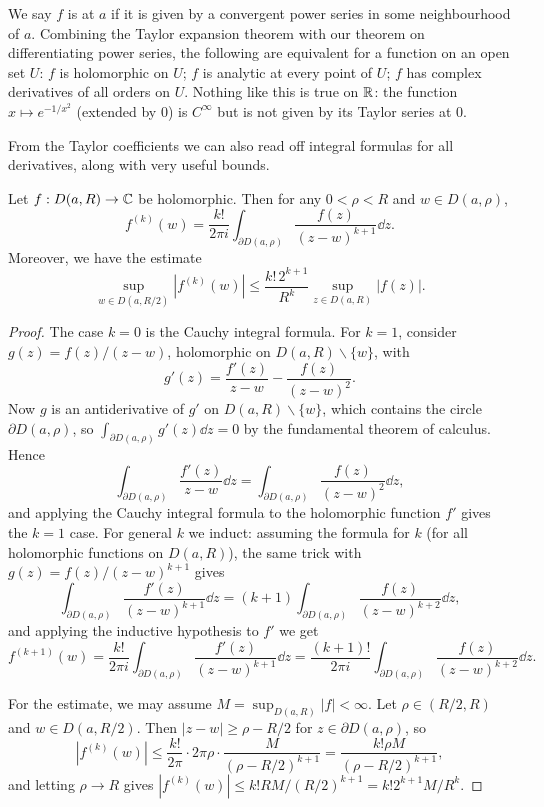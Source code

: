 \documentclass[a4paper]{scrartcl}
\begin{document}
\begin{remark}[Holomorphic = Analytic]
    We say $f$ is  at $a$ if it is given by a convergent power series in some neighbourhood of $a$. Combining the Taylor expansion theorem with our theorem on differentiating power series, the following are equivalent for a function on an open set $U$: $f$ is holomorphic on $U$; $f$ is analytic at every point of $U$; $f$ has complex derivatives of all orders on $U$. Nothing like this is true on $\mathbb{R}$: the function $x \mapsto e^{-1/x^2}$ (extended by $0$) is $C^\infty$ but is not given by its Taylor series at $0$.
\end{remark}

From the Taylor coefficients we can also read off integral formulas for all derivatives, along with very useful bounds.

\begin{theorem}
    Let $f: D(a, R) \rightarrow \mathbb{C}$ be holomorphic. Then for any $0 < \rho < R$ and $w \in D(a, \rho)$,
    $$
    f^{(k)}(w) = \frac{k!}{2 \pi i} \int_{\partial D(a, \rho)} \frac{f(z)}{(z - w)^{k + 1}} \dd z.
    $$
    Moreover, we have the estimate
    $$
    \sup_{w \in D(a, R/2)} |f^{(k)}(w)| \leq \frac{k! \, 2^{k + 1}}{R^k} \sup_{z \in D(a, R)} |f(z)|.
    $$
\end{theorem}
\begin{proof}
    The case $k = 0$ is the Cauchy integral formula. For $k = 1$, consider $g(z) = f(z)/(z - w)$, holomorphic on $D(a, R) \backslash \{w\}$, with
    $$
    g'(z) = \frac{f'(z)}{z - w} - \frac{f(z)}{(z - w)^2}.
    $$
    Now $g$ is an antiderivative of $g'$ on $D(a, R) \backslash \{w\}$, which contains the circle $\partial D(a, \rho)$, so $\int_{\partial D(a, \rho)} g'(z) \dd z = 0$ by the fundamental theorem of calculus. Hence
    $$
    \int_{\partial D(a, \rho)} \frac{f'(z)}{z - w} \dd z = \int_{\partial D(a, \rho)} \frac{f(z)}{(z - w)^2} \dd z,
    $$
    and applying the Cauchy integral formula to the holomorphic function $f'$ gives the $k = 1$ case. For general $k$ we induct: assuming the formula for $k$ (for all holomorphic functions on $D(a,R)$), the same trick with $g(z) = f(z)/(z - w)^{k + 1}$ gives
    $$
    \int_{\partial D(a, \rho)} \frac{f'(z)}{(z - w)^{k + 1}} \dd z = (k + 1)\int_{\partial D(a, \rho)} \frac{f(z)}{(z - w)^{k + 2}} \dd z,
    $$
    and applying the inductive hypothesis to $f'$ we get
    $$
    f^{(k + 1)}(w) = \frac{k!}{2 \pi i} \int_{\partial D(a, \rho)} \frac{f'(z)}{(z - w)^{k + 1}} \dd z = \frac{(k + 1)!}{2 \pi i}\int_{\partial D(a, \rho)} \frac{f(z)}{(z - w)^{k + 2}} \dd z.
    $$

    For the estimate, we may assume $M = \sup_{D(a, R)}|f| < \infty$. Let $\rho \in (R/2, R)$ and $w \in D(a, R/2)$. Then $|z - w| \geq \rho - R/2$ for $z \in \partial D(a, \rho)$, so
    $$
    |f^{(k)}(w)| \leq \frac{k!}{2 \pi} \cdot 2 \pi \rho \cdot \frac{M}{(\rho - R/2)^{k + 1}} = \frac{k! \rho M}{(\rho - R/2)^{k + 1}},
    $$
    and letting $\rho \rightarrow R$ gives $|f^{(k)}(w)| \leq k! R M/(R/2)^{k + 1} = k! 2^{k + 1} M / R^{k}$.
\end{proof}
\end{document}
